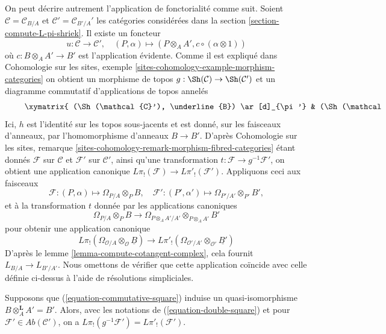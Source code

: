 \medskip\noindent
On peut décrire autrement l'application de fonctorialité comme suit. Soient
$\mathcal{C} = \mathcal{C}_{B/A}$ et $\mathcal{C}' = \mathcal{C}_{B'/A}'$
les catégories considérées dans la section
\ref{section-compute-L-pi-shriek}. Il existe un foncteur
$$
u : \mathcal{C} \longrightarrow \mathcal{C}',\quad
(P, \alpha) \longmapsto (P \otimes_A A', c \circ (\alpha \otimes 1))
$$
où $c : B \otimes_A A' \to B'$ est l'application évidente. Comme il est
expliqué dans Cohomologie sur les sites, exemple
\ref{sites-cohomology-example-morphism-categories}
on obtient un morphisme de topos $g : \Sh(\mathcal{C}) \to \Sh(\mathcal{C}')$
et un diagramme commutatif d'applications de topos annelés
\begin{equation}
\label{equation-double-square}
\vcenter{
\xymatrix{
(\Sh(\mathcal{C}'), \underline{B}) \ar[d]_{\pi'} &
(\Sh(\mathcal{C}'), \underline{B'}) \ar[d]_{\pi'} \ar[l]^h &
(\Sh(\mathcal{C}), \underline{B'}) \ar[d]_\pi \ar[l]^g \\
(\Sh(*), B) &
(\Sh(*), B') \ar[l]_f &
(\Sh(*), B') \ar[l]
}
}
\end{equation}
Ici, $h$ est l'identité sur les topos sous-jacents et est donné, sur les
faisceaux d'anneaux, par l'homomorphisme d'anneaux $B \to B'$. 
D'après Cohomologie sur les sites, remarque
\ref{sites-cohomology-remark-morphism-fibred-categories}
étant donnés $\mathcal{F}$ sur $\mathcal{C}$ et $\mathcal{F}'$ sur
$\mathcal{C}'$, ainsi qu'une transformation
$t : \mathcal{F} \to g^{-1}\mathcal{F}'$, on obtient une application canonique
$L\pi_!(\mathcal{F}) \to L\pi'_!(\mathcal{F}')$. Appliquons ceci aux faisceaux
$$
\mathcal{F} : (P, \alpha) \mapsto \Omega_{P/A} \otimes_P B,\quad
\mathcal{F}' : (P', \alpha') \mapsto \Omega_{P'/A'} \otimes_{P'} B',
$$
et à la transformation $t$ donnée par les applications canoniques
$$
\Omega_{P/A} \otimes_P B \longrightarrow
\Omega_{P \otimes_A A'/A'} \otimes_{P \otimes_A A'} B'
$$
pour obtenir une application canonique
$$
L\pi_!(\Omega_{\mathcal{O}/A} \otimes_\mathcal{O} \underline{B})
\longrightarrow
L\pi'_!(\Omega_{\mathcal{O}'/A'} \otimes_{\mathcal{O}'} \underline{B'})
$$
D'après le lemme \ref{lemma-compute-cotangent-complex}, cela fournit
$L_{B/A} \to L_{B'/A'}$. Nous omettons de vérifier que cette application
coïncide avec celle définie ci-dessus à l'aide de résolutions simpliciales.

\begin{lemma}
\label{lemma-flat-base-change}
Supposons que (\ref{equation-commutative-square}) induise un quasi-isomorphisme
$B \otimes_A^\mathbf{L} A' = B'$. Alors, avec les notations de
(\ref{equation-double-square}) et pour
$\mathcal{F}' \in \textit{Ab}(\mathcal{C}')$, on a
$L\pi_!(g^{-1}\mathcal{F}') = L\pi'_!(\mathcal{F}')$.
\end{lemma}

